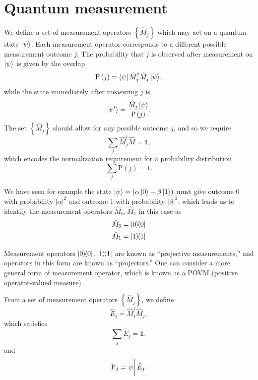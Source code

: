 \FloatBarrier
\section{Quantum measurement}
We define a set of measurement operators $\left\{\hat{M}_j\right\}$ which may act on a quantum state $\ket{\psi}$. Each measurement operator corresponds to a different possible measurement outcome $j$. The probability that $j$ is observed after measurement on $\ket{\psi}$ is given by the overlap
\begin{equation}
\text{P}\left(j\right) = \bra{\psi}\hat{M}^\dagger_j \hat{M}_j\ket{\psi},
\end{equation}
while the state immediately after measuring $j$ is 
\begin{equation}
\ket{\psi^\prime} = \frac{\hat{M}_j \ket{\psi}}{\text{P}\left(j\right)}.
\end{equation}
The set $\left\{\hat{M}_j\right\}$ should allow for any possible outcome $j$, and so we require
\begin{equation}
\sum_j \hat{M}_j^\dagger \hat{M} = \mathds{1},
\end{equation}
which encodes the normalization requirement for a probability distribution
\begin{equation}
\sum_j \text{P}\left(j\right) = 1.
\end{equation}

\noindent We have seen for example the state $\ket{\psi} = \left(\alpha\ket{0}  + \beta\ket{1}\right)$ must give outcome $0$ with probability $\left|\alpha\right|^2$ and outcome $1$ with probability $\left|\beta\right|^2$, which leads us to identify the measurement operators $\hat{M}_0, \hat{M}_1$ in this case as
\begin{align*}
&\hat{M}_0 = \dyad{0} \\
&\hat{M}_1 = \dyad{1}
\end{align*}

\noindent Measurement operators $\dyad{0}, \dyad{1}$ are known as ``projective measurements,'' and operators in this form are known as ``projectors.'' One can consider a more general form of measurement operator, which is known as a POVM (positive operator-valued measure).

From a set of measurement operators $\left\{\hat{M}_j\right\}$, we define
\begin{equation}
\hat{E}_j = \hat{M}^\dagger_j \hat{M}_j,
\end{equation}
which satisfies
\begin{equation}
\sum_j \hat{E}_j = \mathds{1},
\end{equation}
and
\begin{equation}
\text{P}_j = \eval{\psi}{\hat{E}_j}.
\end{equation}

